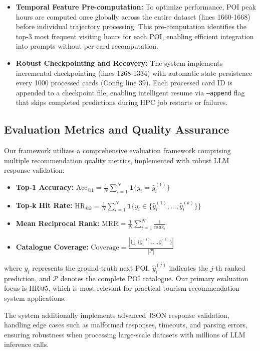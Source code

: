\documentclass{article}
\begin{document}
\begin{itemize}
    \item \textbf{Temporal Feature Pre-computation:} To optimize performance, POI peak hours are computed once globally across the entire dataset (lines 1660-1668) before individual trajectory processing. This pre-computation identifies the top-3 most frequent visiting hours for each POI, enabling efficient integration into prompts without per-card recomputation.

    \item \textbf{Robust Checkpointing and Recovery:} The system implements incremental checkpointing (lines 1268-1334) with automatic state persistence every 1000 processed cards (Config line 39). Each processed card ID is appended to a checkpoint file, enabling intelligent resume via \texttt{--append} flag that skips completed predictions during HPC job restarts or failures.
\end{itemize}

\subsection{Evaluation Metrics and Quality Assurance}

Our framework utilizes a comprehensive evaluation framework comprising multiple recommendation quality metrics, implemented with robust LLM response validation:

\begin{itemize}
    \item \textbf{Top-1 Accuracy:} $\text{Acc}_{@1} = \frac{1}{N}\sum_{i=1}^{N}\mathbf{1}\{y_i = \hat{y}_i^{(1)}\}$
    \item \textbf{Top-k Hit Rate:} $\text{HR}_{@k} = \frac{1}{N}\sum_{i=1}^{N}\mathbf{1}\{y_i \in \{\hat{y}_i^{(1)}, \ldots, \hat{y}_i^{(k)}\}\}$
    \item \textbf{Mean Reciprocal Rank:} $\text{MRR} = \frac{1}{N}\sum_{i=1}^{N}\frac{1}{\text{rank}_i}$
    \item \textbf{Catalogue Coverage:} $\text{Coverage} = \frac{|\bigcup_{i}\{\hat{y}_i^{(1)}, \ldots, \hat{y}_i^{(k)}\}|}{|\mathcal{P}|}$
\end{itemize}

where $y_i$ represents the ground-truth next POI, $\hat{y}_i^{(j)}$ indicates the $j$-th ranked prediction, and $\mathcal{P}$ denotes the complete POI catalogue. Our primary evaluation focus is HR@5, which is most relevant for practical tourism recommendation system applications.

The system additionally implements advanced JSON response validation, handling edge cases such as malformed responses, timeouts, and parsing errors, ensuring robustness when processing large-scale datasets with millions of LLM inference calls.
\end{document}
